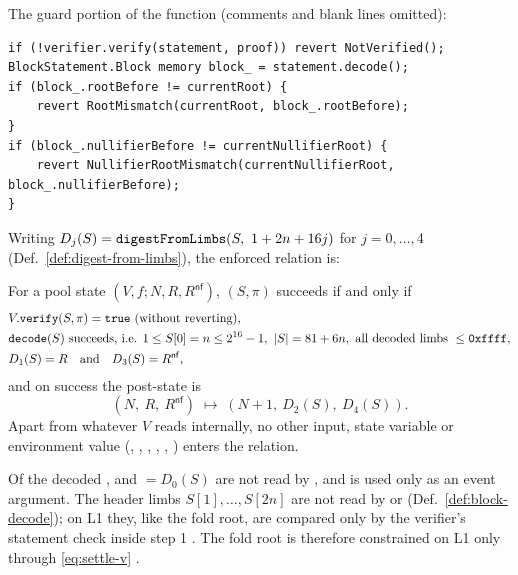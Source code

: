 The guard portion of the function (comments and blank lines omitted):
\begin{Verbatim}[fontsize=\small]
if (!verifier.verify(statement, proof)) revert NotVerified();
BlockStatement.Block memory block_ = statement.decode();
if (block_.rootBefore != currentRoot) {
    revert RootMismatch(currentRoot, block_.rootBefore);
}
if (block_.nullifierBefore != currentNullifierRoot) {
    revert NullifierRootMismatch(currentNullifierRoot, block_.nullifierBefore);
}
\end{Verbatim}

Writing $D_j(S) = \texttt{digestFromLimbs}(S,\ 1+2n+16j)$ for $j=0,\dots,4$
(Def.~\ref{def:digest-from-limbs}), the enforced relation is:

\begin{definition}
\label{def:settle-rel}
For a pool state $(V,f;N,R,R^{\mathsf{nf}})$, $(S,\pi)$
succeeds if and only if
\begin{align}
  &V.\texttt{verify}(S,\pi) = \texttt{true} \text{ (without reverting)}, \label{eq:settle-v}\\
  &\texttt{decode}(S) \text{ succeeds, i.e. } 1\le S[0]=n\le 2^{16}-1,\ |S| = 81+6n,
     \text{ all decoded limbs } \le \texttt{0xffff}, \label{eq:settle-d}\\
  &D_1(S) = R \quad\text{and}\quad D_3(S) = R^{\mathsf{nf}}, \label{eq:settle-c}
\end{align}
and on success the post-state is
\begin{equation}
  (N,\ R,\ R^{\mathsf{nf}}) \;\mapsto\; (N+1,\ D_2(S),\ D_4(S)).
\end{equation}
Apart from whatever $V$ reads internally, no other input, state variable or
environment value (, , ,
, , ) enters the
relation.
\end{definition}

\begin{property}
\label{prop:apply-unused}
Of the decoded ,  and
 $=D_0(S)$ are not read by , and
 is used only as an event argument.
The header limbs $S[1],\dots,S[2n]$ are not read by  or
 (Def.~\ref{def:block-decode}); on L1 they, like the fold
root, are compared only by the verifier's statement check inside step 1
.
The fold root is therefore constrained on L1 only through \eqref{eq:settle-v}
.
\end{property}

